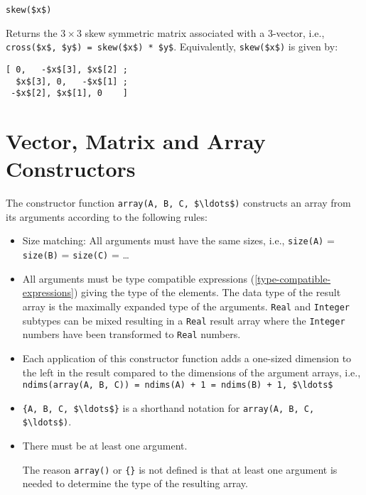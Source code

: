 \begin{functiondefinition}[skew]
\begin{synopsis}\begin{lstlisting}
skew($x$)
\end{lstlisting}\end{synopsis}
\begin{semantics}
Returns the $3 \times 3$ skew symmetric matrix associated with a 3-vector, i.e., \lstinline!cross($x$, $y$) = skew($x$) * $y$!.  Equivalently, \lstinline!skew($x$)! is given by:
\begin{lstlisting}[frame=none]
[ 0,   -$x$[3], $x$[2] ;
  $x$[3], 0,   -$x$[1] ;
 -$x$[2], $x$[1], 0    ]
\end{lstlisting}
\end{semantics}
\end{functiondefinition}

\section{Vector, Matrix and Array Constructors}\label{vector-matrix-and-array-constructors}

The constructor function \lstinline!array(A, B, C, $\ldots$)! constructs an array from its arguments according to the following rules:
\begin{itemize}
\item
  Size matching: All arguments must have the same sizes, i.e.,
  \lstinline!size(A)! = \lstinline!size(B)! = \lstinline!size(C)! = \ldots
\item
  All arguments must be type compatible expressions (\cref{type-compatible-expressions}) giving the type of the elements.  The data type of the result array is the
  maximally expanded type of the arguments. \lstinline!Real! and \lstinline!Integer! subtypes can be mixed resulting in a \lstinline!Real! result array where the
  \lstinline!Integer! numbers have been transformed to \lstinline!Real! numbers.
\item
  Each application of this constructor function adds a one-sized dimension to the left in the result compared to the dimensions of the argument arrays, i.e.,
  \lstinline!ndims(array(A, B, C)) = ndims(A) + 1 = ndims(B) + 1, $\ldots$!
\item
  \lstinline!{A, B, C, $\ldots$}! is a shorthand notation for \lstinline!array(A, B, C, $\ldots$)!.
\item
  There must be at least one argument.
  \begin{nonnormative}
  The reason \lstinline!array()! or \lstinline!{}! is not defined is that at least one argument is needed to determine the type of the resulting array.
  \end{nonnormative}
\end{itemize}

